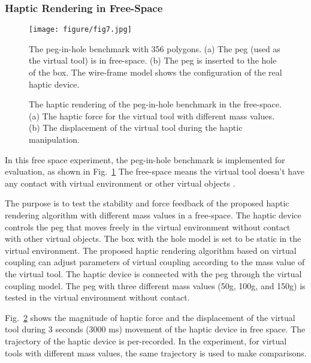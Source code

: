 \documentclass[10pt,journal,cspaper,compsoc]{IEEEtran}
\begin{document}
\subsubsection{Haptic Rendering in Free-Space}
\label{sec_5.3.1}

\begin{figure}[!t]
	\centering
	\texttt{[image: figure/fig7.jpg]}
	\caption{The peg-in-hole benchmark with 356 polygons. (a) The peg (used as the virtual tool) is in free-space. (b) The peg is inserted to the hole of the box. The wire-frame model shows the configuration of the real haptic device.}
	\label{fig:peg}
\end{figure}

\begin{figure}\centering
	\caption{The haptic rendering of the peg-in-hole benchmark in the free-space. (a) The haptic force for the virtual tool with different mass values. (b) The displacement of the virtual tool during the haptic manipulation.}
	\label{fig8_ab}
\end{figure}

In this free space experiment, the peg-in-hole benchmark is implemented for evaluation, as shown in Fig.~\ref{fig:peg} The free-space means the virtual tool doesn't have any contact with virtual environment or other virtual objects \cite{no25}.


The purpose is to test the stability and force feedback of the proposed haptic rendering algorithm with different mass values in a free-space. The haptic device controls the peg that moves freely in the virtual environment without contact with other virtual objects. The box with the hole model is set to be static in the virtual environment. The proposed haptic rendering algorithm based on virtual coupling can adjust parameters of virtual coupling according to the mass value of the virtual tool.  The haptic device is connected with the peg through the virtual coupling model. The peg with three different mass values (50g, 100g, and 150g) is tested in the virtual environment without contact. 

Fig.~\ref{fig8_ab} shows the magnitude of haptic force and the displacement of the virtual tool during 3 seconds (3000 ms) movement of the haptic device in free space. The trajectory of the haptic device is per-recorded. In the experiment, for virtual tools with different mass values, the same trajectory is used to make comparisons.
\end{document}
